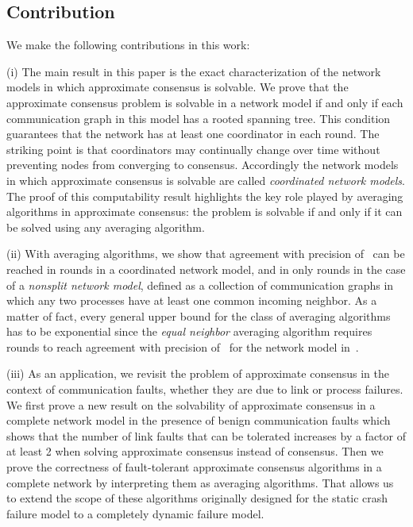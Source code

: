 \documentclass[a4paper]{article}
\theoremstyle{newthm}
\begin{document}
\subsection{Contribution}

We make the following contributions in this work:

(i) The main result in this paper is the exact characterization of the network models
	in which approximate consensus is solvable.
We prove that the approximate consensus problem is solvable in a network model
	if and only if each communication graph in this model has a rooted spanning tree.
This condition guarantees that 
	the network has at least one coordinator in each round.
The striking point is that 
	coordinators may continually change over time without preventing nodes
	from converging to consensus.
Accordingly the network models in which 
	approximate consensus is solvable are called {\em coordinated network models}.
The proof of this computability result highlights the key role played by averaging
	algorithms in approximate consensus: the problem is solvable if and only if
	it can be solved using any averaging algorithm.

(ii) With  averaging algorithms, we show that agreement with precision of~ can be reached in 
	 rounds  
	in a coordinated network model, and in only  rounds
	in the case of  a {\em nonsplit network model}, defined as a collection
	of communication graphs in which any two processes have at least one common incoming neighbor.
As a matter of fact, every general upper bound
	for the class of averaging algorithms has to be exponential since  the {\em equal neighbor} averaging algorithm 
	requires  
	rounds to reach agreement with precision of~
	for the network model in~\cite{OT11v1}.

	
(iii) As an application, we revisit the problem of approximate consensus in the
	context of communication faults, whether they are due to  link or process failures.
We  first prove a new result  on the solvability of approximate consensus in a complete  
	network model in the presence of benign communication faults which shows that the number 
	of link faults that can be tolerated increases by a factor of at least 2 
	when solving  approximate consensus instead of consensus.
Then we prove the correctness of  fault-tolerant 
	approximate consensus  algorithms in a complete network by 
	interpreting them as averaging algorithms.
That allows us to extend the scope of these algorithms originally designed for the static crash failure model
	to a completely dynamic failure model. 
	
\end{document}
